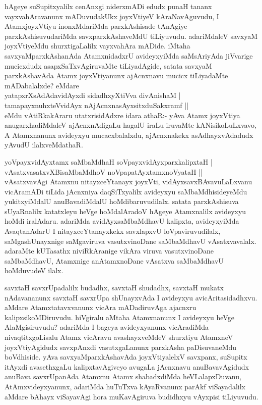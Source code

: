 \begin{artha}
hAgeye suSupitxyalilx cenAnxgi niderxmADi edudx punaH tananx vayxvahAravanunx mADuvudakUkx joyxVtiyeV kAraNavAguvudu, I AtamxjoyxVtiyu inonxMdariMda parxkAshisade tAnAgiye parxkAshisuvudariMda savxparxkAshaveMdU tiLiyuvudu. adariMdaleV savxyaM joyxVtiyeMdu shurxtigaLalilx vayxvahAra mADide. iMtaha savxyaMparxkAshanAda AtamxnidadxrU avideyxyiMda saMsAriyAda jiVvarige mucicxdudx asapxSaTxvAgiruvaMte tiLiyadAgide, satata savxyaM parxkAshavAda Atamx joyxVtiyanunx ajAcnxnavu mucicx tiLiyadaMte mADabalalxde? eMdare \\yatapxrXsAdAdavidAyxdi sidadhxyXtiVva divAnishaM | \\
tamapayxnuhxteV\s vidAyx nAjAcnxnasAyxsitxduSakxramf || \\
eMdu vAtiRkakAraru utatxrisidAdxre idara athaR:- yAva Atamx joyxVtiya anugarxhadiMdaleV ajAcnxnAdigaLu hagalU iraLu iruvaMte kANisikoLuLxvavo, A Atamxnanunx avideyxyu mucacxbalalxdu, ajAcnxnakekx asAdhayxvAdadudx yAvudU ilalxveMdathaR.
\end{artha}


\begin{artha}
yoV\s payxvidAyxtamx saMbaMdhaH soV\s payxvidAyxparxkalipxtaH |\\
vAsatxvasatxvXBisaMbaMdhoV noVpapatAyxtamxnoVyataH ||\\
vAsatxvavAgi Atamxnu nitayxceYtanayx joyxVti, vidAyxsavxBAvavuLaLxvanu vicAramADi tiLida jAcnxniya daqSiTxyalilx avideyxyu saMbaMdhisideyeMdu yukitxyiMdalU anuBavadiMdalU hoMdibaruvudilalx. satata parxkAshisuva sUyaRnalilx katatxleyu heVge hoMdalAradoV hAgeye Atamxnalilx avideyxyu hoMdi iralAdaru. adariMda avidAyxsaMbaMdhavU kalipxta, avideyxyiMda AvaqtanAdarU I nitayxceYtanayxkekx savxlapxvU loVpaviruvudilalx, saMgashUnayxnige saMgaviruva vasutxvinoDane saMbaMdhavU vAsatxvavalalx. adaraMte kUTasathx niviRkAranige vikAra viruva vasutxvinoDane saMbaMdhavU, Atamxnige anAtamxnoDane vAsatxva saMbaMdhavU hoMduvudeV ilalx.
\end{artha}

\begin{artha}
savxtaH savxrUpadalilx budadhx, savxtaH shudadhx, savxtaH  mukatx nAdavananunx savxtaH savxrUpa shUnayxvAda I avideyxyu avicAritasidadhxvu. aMdare Atamxtatavxvanunx vicAra mADadiruvAga ajacnxru kalipxsikoMDiruvudu. hiVgiralu aMtaha Atamxnanunx I avideyxyu heVge AlaMgisiruvudu? adariMda I bageya avideyxyanunx vicAradiMda nivaqtitxgoLisalu Atamx vicAravu avashayxveMdeV shurxtiyu AtamxneV joyxVtiyAgidudx savxpAnxdi vasutxgaLanunx parxkAsha paDisuvaneMdu boVdhiside. yAva savxyaMparxkAshavAda joyxVtiyalelxV savxpanx, suSupitx itAyxdi avasethxgaLu kalipxtavAgiveyo avugaLa jAcnxnavu anuBavavAgidudx anuBava savxrUpanAda Atamxnu Atamx shabadxdiMda heVLalapxDuvanu, AtAmxvideyxyanunx, adariMda huTuTxva kAyaRvanunx parAkf viSayadalilx aMdare bAhayx viSayavAgi hora muKavAgiruva budidhxyu vAyxpisi tiLiyuvudu.
\end{artha}

